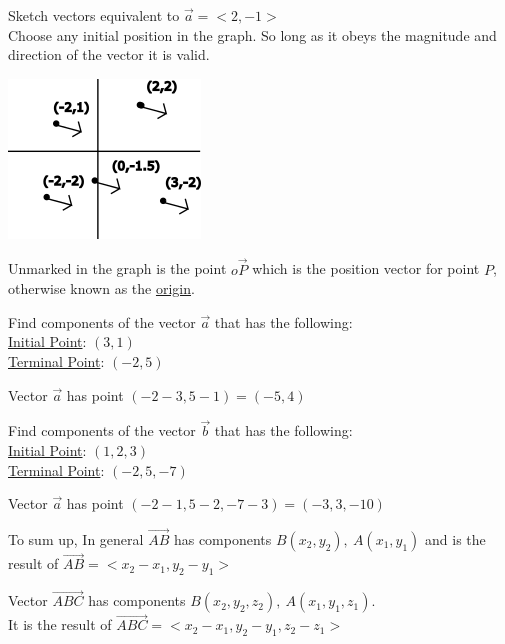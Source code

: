 \documentclass[10pt]{article}
\begin{document}
Sketch vectors equivalent to $\vec{a} = <2, -1>$ \\Choose any initial position in the graph. So long as it obeys the magnitude and direction of the vector it is valid.

\includegraphics{equivalentvectors2d}

Unmarked in the graph is the point $o \vec{P}  $ which is the position vector for point $P$, otherwise known as the \underline{origin}.

Find components of the vector $\vec{a}  $ that has the following:\\\underline{Initial Point}: $(3,1)$\\\underline{Terminal Point}: $(-2,5)$

\bigskip
Vector $\vec{a}  $ has point $(-2-3,5-1)=(-5,4)$

Find components of the vector $\vec{b}  $ that has the following:\\\underline{Initial Point}: $(1,2,3)$\\\underline{Terminal Point}: $(-2,5,-7)$

\bigskip
Vector $\vec{a}  $ has point $(-2-1,5-2,-7-3)=(-3,3,-10)$

\bigskip
To sum up,
In general $\vec{AB}  $ has components $B(x_2,y_2),\ A(x_1,y_1) $ and is the result of $\vec{AB} =<x_2-x_1,y_2-y_1> $

\bigskip
Vector $\vec{ABC}  $ has components $B(x_2,y_2,z_2),\ A(x_1,y_1,z_1)$.\\It is the result of $\vec{ABC} =<x_2-x_1,y_2-y_1,z_2-z_1> $ 
\end{document}
